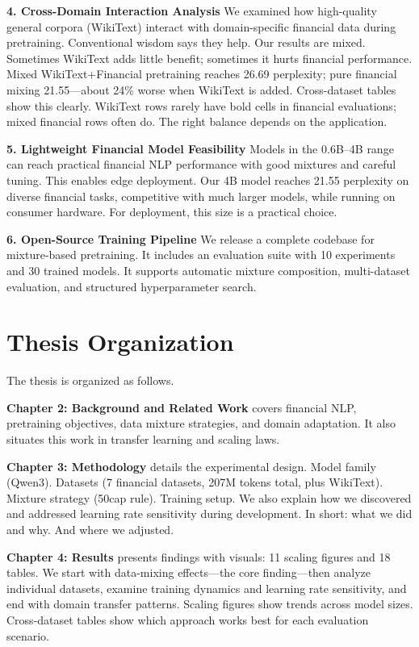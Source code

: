 \textbf{4. Cross-Domain Interaction Analysis}
We examined how high-quality general corpora (WikiText) interact with domain-specific financial data during pretraining. Conventional wisdom says they help. Our results are mixed. Sometimes WikiText adds little benefit; sometimes it hurts financial performance. Mixed WikiText+Financial pretraining reaches 26.69 perplexity; pure financial mixing 21.55—about 24\% worse when WikiText is added. Cross-dataset tables show this clearly. WikiText rows rarely have bold cells in financial evaluations; mixed financial rows often do. The right balance depends on the application.

\textbf{5. Lightweight Financial Model Feasibility}
Models in the 0.6B--4B range can reach practical financial NLP performance with good mixtures and careful tuning. This enables edge deployment. Our 4B model reaches 21.55 perplexity on diverse financial tasks, competitive with much larger models, while running on consumer hardware. For deployment, this size is a practical choice.

\textbf{6. Open-Source Training Pipeline}
We release a complete codebase for mixture-based pretraining. It includes an evaluation suite with 10 experiments and 30 trained models. It supports automatic mixture composition, multi-dataset evaluation, and structured hyperparameter search.

\section{Thesis Organization}

The thesis is organized as follows.

\textbf{Chapter 2: Background and Related Work} covers financial NLP, pretraining objectives, data mixture strategies, and domain adaptation. It also situates this work in transfer learning and scaling laws.

\textbf{Chapter 3: Methodology} details the experimental design. Model family (Qwen3). Datasets (7 financial datasets, 207M tokens total, plus WikiText). Mixture strategy (50cap rule). Training setup. We also explain how we discovered and addressed learning rate sensitivity during development. In short: what we did and why. And where we adjusted.

\textbf{Chapter 4: Results} presents findings with visuals: 11 scaling figures and 18 tables. We start with data-mixing effects—the core finding—then analyze individual datasets, examine training dynamics and learning rate sensitivity, and end with domain transfer patterns. Scaling figures show trends across model sizes. Cross-dataset tables show which approach works best for each evaluation scenario.

